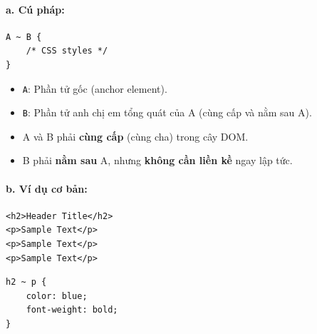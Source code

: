 \documentclass[11pt,oneside]{book}
\newcommand{\codeinline}[1]{\textcolor{accentOrange}{\texttt{#1}}}
\begin{document}
\paragraph{a. Cú pháp:}
\begin{codeWindow}
\begin{lstlisting}[language=CSS3]
A ~ B {
    /* CSS styles */
}
\end{lstlisting}
\end{codeWindow}

\begin{itemize}[leftmargin=1.5em, itemsep=2pt, parsep=0pt]
    \item \codeinline{A}: Phần tử gốc (anchor element).
    \item \codeinline{B}: Phần tử anh chị em tổng quát của A (cùng cấp và nằm sau A).
\end{itemize}

\begin{noteBox}
\begin{itemize}[leftmargin=1.5em, itemsep=2pt, parsep=0pt]
    \item A và B phải \textbf{cùng cấp} (cùng cha) trong cây DOM.
    \item B phải \textbf{nằm sau} A, nhưng \textbf{không cần liền kề} ngay lập tức.
\end{itemize}
\end{noteBox}

\paragraph{b. Ví dụ cơ bản:}
\begin{codeWindow}
\begin{lstlisting}[language=HTML5]
<h2>Header Title</h2>
<p>Sample Text</p>
<p>Sample Text</p>
<p>Sample Text</p>
\end{lstlisting}

\begin{lstlisting}[language=CSS3]
h2 ~ p {
    color: blue;
    font-weight: bold;
}
\end{lstlisting}
\end{codeWindow}
\end{document}
